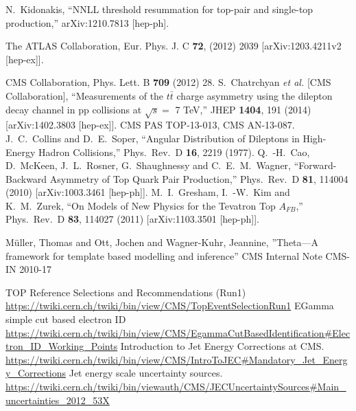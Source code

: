\documentclass{cmspaperpdf}
\begin{document}
\begin{thebibliography}{9}
  N.~Kidonakis,
  ``NNLL threshold resummation for top-pair and single-top production,''
  arXiv:1210.7813 [hep-ph].
  
 The ATLAS Collaboration, Eur. Phys. J. C \textbf{72}, (2012) 2039 [arXiv:1203.4211v2 [hep-ex]].
   
  CMS Collaboration, Phys. Lett. B \textbf{709} (2012) 28.
  S.~Chatrchyan {\it et al.}  [CMS Collaboration],
  ``Measurements of the $t\bar{t}$ charge asymmetry using the dilepton decay channel in pp collisions at $\sqrt{s} =$ 7 TeV,''
  JHEP {\bf 1404}, 191 (2014)
  [arXiv:1402.3803 [hep-ex]].
  CMS PAS TOP-13-013, CMS AN-13-087.
  J.~C.~Collins and D.~E.~Soper,
  ``Angular Distribution of Dileptons in High-Energy Hadron Collisions,''
  Phys.\ Rev.\ D {\bf 16}, 2219 (1977).
  Q.~-H.~Cao, D.~McKeen, J.~L.~Rosner, G.~Shaughnessy and C.~E.~M.~Wagner,
  ``Forward-Backward Asymmetry of Top Quark Pair Production,''
  Phys.\ Rev.\ D {\bf 81}, 114004 (2010)
  [arXiv:1003.3461 [hep-ph]].
  M.~I.~Gresham, I.~-W.~Kim and K.~M.~Zurek,
  ``On Models of New Physics for the Tevatron Top $A_{FB}$,''
  Phys.\ Rev.\ D {\bf 83}, 114027 (2011)
  [arXiv:1103.3501 [hep-ph]].
  

M{\"u}ller, Thomas and Ott, Jochen and Wagner-Kuhr, Jeannine,
''Theta—A framework for template based modelling and inference''
CMS Internal Note CMS-IN 2010-17

 TOP Reference Selections and Recommendations (Run1) \url{https://twiki.cern.ch/twiki/bin/view/CMS/TopEventSelectionRun1}
 EGamma simple cut based electron ID \url{ https://twiki.cern.ch/twiki/bin/view/CMS/EgammaCutBasedIdentification#Electron_ID_Working_Points}
 Introduction to Jet Energy Corrections at CMS. \url{ https://twiki.cern.ch/twiki/bin/view/CMS/IntroToJEC#Mandatory_Jet_Energy_Corrections}
 Jet energy scale uncertainty sources. \url{ https://twiki.cern.ch/twiki/bin/viewauth/CMS/JECUncertaintySources#Main_uncertainties_2012_53X}


\end{thebibliography}
\end{document}

